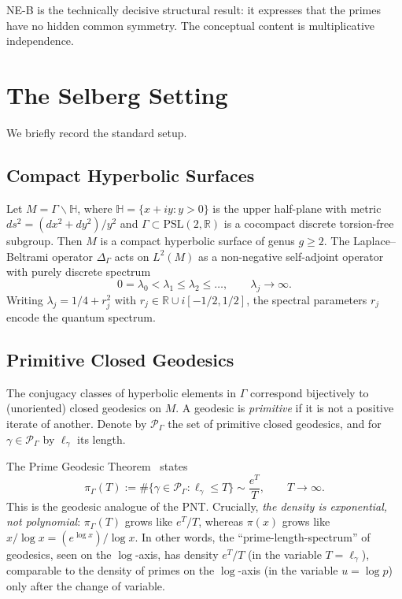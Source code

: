\documentclass[12pt,a4paper]{article}
\theoremstyle{definition}
\theoremstyle{remark}
\newcommand{\HH}{\mathbb{H}}
\newcommand{\RR}{\mathbb{R}}
\newcommand{\Delop}{\Delta_{\Gamma}}
\begin{document}
NE-B is the technically decisive structural result: it expresses that the
primes have no hidden common symmetry. The conceptual content is
multiplicative independence.


\section{The Selberg Setting}
\label{sec:selberg-setting}

We briefly record the standard setup.

\subsection{Compact Hyperbolic Surfaces}

Let $M = \Gamma\backslash\HH$, where $\HH = \{x+iy : y > 0\}$ is the upper
half-plane with metric $ds^2 = (dx^2+dy^2)/y^2$ and $\Gamma \subset \mathrm{PSL}(2,\RR)$
is a cocompact discrete torsion-free subgroup. Then $M$ is a compact
hyperbolic surface of genus $g \ge 2$. The Laplace--Beltrami operator
$\Delop$ acts on $L^2(M)$ as a non-negative self-adjoint operator with
purely discrete spectrum
\begin{equation}
0 = \lambda_0 < \lambda_1 \le \lambda_2 \le \dots,\qquad \lambda_j \to \infty.
\end{equation}
Writing $\lambda_j = 1/4 + r_j^2$ with $r_j \in \RR \cup i[-1/2, 1/2]$, the
spectral parameters $r_j$ encode the quantum spectrum.

\subsection{Primitive Closed Geodesics}

The conjugacy classes of hyperbolic elements in $\Gamma$ correspond bijectively
to (unoriented) closed geodesics on $M$. A geodesic is \emph{primitive} if it
is not a positive iterate of another. Denote by $\mathcal{P}_\Gamma$ the set
of primitive closed geodesics, and for $\gamma \in \mathcal{P}_\Gamma$ by
$\ell_\gamma$ its length.

The Prime Geodesic Theorem~\cite{Huber1959, Sarnak1981} states
\begin{equation}
\label{eq:PGT}
\pi_\Gamma(T) := \#\{\gamma \in \mathcal{P}_\Gamma : \ell_\gamma \le T\} \sim \frac{e^T}{T},\qquad T \to \infty.
\end{equation}
This is the geodesic analogue of the PNT. Crucially, \emph{the density is
exponential, not polynomial}: $\pi_\Gamma(T)$ grows like $e^T/T$, whereas
$\pi(x)$ grows like $x/\log x = (e^{\log x})/\log x$. In other words, the
``prime-length-spectrum'' of geodesics, seen on the $\log$-axis, has density
$e^T/T$ (in the variable $T = \ell_\gamma$), comparable to the density of
primes on the $\log$-axis (in the variable $u = \log p$) only after the
change of variable.
\end{document}
